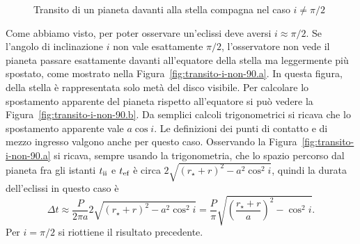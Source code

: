 \begin{figure}
{}
  \caption{Transito di un pianeta davanti alla stella compagna nel caso
    $i \neq \pi/2$}
  \label{fig:transito-i-non-90}
\end{figure}
Come abbiamo visto, per poter osservare un'eclissi deve aversi $i \approx
\pi/2$. Se l'angolo di inclinazione $i$ non vale esattamente $\pi/2$,
l'osservatore non vede il pianeta passare esattamente davanti all'equatore della
stella ma leggermente più spostato, come mostrato nella
Figura~\ref{fig:transito-i-non-90.a}. In questa figura, della stella è
rappresentata solo metà del disco visibile. Per calcolare lo spostamento
apparente del pianeta rispetto all'equatore si può vedere la
Figura~\ref{fig:transito-i-non-90.b}. Da semplici calcoli trigonometrici si
ricava che lo spostamento apparente vale $a \cos i$. Le definizioni dei punti di
contatto e di mezzo ingresso valgono anche per questo caso. Osservando la
Figura~\ref{fig:transito-i-non-90.a} si ricava, sempre usando la trigonometria,
che lo spazio percorso dal pianeta fra gli istanti $t_{\textup{ii}}$ e
$t_{\textup{ef}}$ è circa $2\sqrt{(r_\star + r)^2 - a^2\cos^2 i}$, quindi la
durata dell'eclissi in questo caso è
\begin{equation}
  \Delta t \approx \frac{P}{2\pi a} 2\sqrt{(r_\star + r)^2 - a^2\cos^2 i} =
  \frac{P}{\pi} \sqrt{\left(\frac{r_\star + r}{a}\right)^2 - \cos^2 i}.
\end{equation}
Per $i = \pi/2$ si riottiene il risultato precedente.

